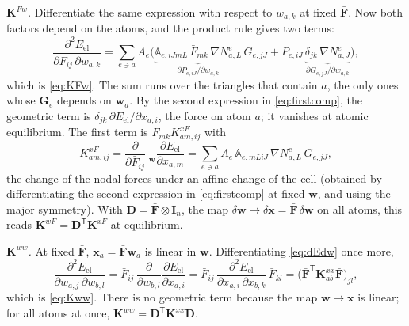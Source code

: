 \documentclass[11pt,a4paper]{article}
\newcommand{\Fb}{\bar{\mathbf F}}
\newcommand{\I}{\mathbf I}
\newcommand{\x}{\mathbf x}
\newcommand{\w}{\mathbf w}
\newcommand{\G}{\mathbf G}
\begin{document}
\emph{\(\mathbf K^{Fw}\).} Differentiate the same expression with respect to \(w_{a,k}\) at fixed
\(\Fb\). Now both factors depend on the atoms, and the product rule gives two terms:
\[
  \frac{\partial^2E_{\mathrm{el}}}{\partial\bar F_{ij}\,\partial w_{a,k}}
  =\sum_{e\ni a}A_e\Big(\underbrace{\mathbb A_{e,iJmL}\,\bar F_{mk}\,\nabla N^e_{a,L}}_{\partial P_{e,iJ}/\partial w_{a,k}}\,G_{e,jJ}
   +P_{e,iJ}\,\underbrace{\delta_{jk}\,\nabla N^e_{a,J}}_{\partial G_{e,jJ}/\partial w_{a,k}}\Big),
\]
which is \eqref{eq:KFw}. The sum runs over the triangles that contain \(a\), the only ones whose
\(\G_e\) depends on \(\w_a\). By the second expression in \eqref{eq:firstcomp}, the geometric term is
\(\delta_{jk}\,\partial E_{\mathrm{el}}/\partial x_{a,i}\), the force on atom \(a\); it vanishes at atomic
equilibrium. The first term is \(\bar F_{mk}K^{xF}_{am,ij}\) with
\begin{equation}
  K^{xF}_{am,ij}=\frac{\partial}{\partial\bar F_{ij}}\Big|_{\w}\frac{\partial E_{\mathrm{el}}}{\partial x_{a,m}}
  =\sum_{e\ni a}A_e\,\mathbb A_{e,mLiJ}\,\nabla N^e_{a,L}\,G_{e,jJ},
  \label{eq:KxF}
\end{equation}
the change of the nodal forces under an affine change of the cell (obtained by differentiating the
second expression in \eqref{eq:firstcomp} at fixed \(\w\), and using the major symmetry). With
\(\mathbf D=\Fb\otimes\I_n\), the map \(\delta\w\mapsto\delta\x=\Fb\,\delta\w\) on all atoms, this reads
\(\mathbf K^{wF}=\mathbf D^{\mathsf T}\mathbf K^{xF}\) at equilibrium.

\emph{\(\mathbf K^{ww}\).} At fixed \(\Fb\), \(\x_a=\Fb\w_a\) is linear in \(\w\). Differentiating
\eqref{eq:dEdw} once more,
\[
  \frac{\partial^2E_{\mathrm{el}}}{\partial w_{a,j}\,\partial w_{b,l}}
  =\bar F_{ij}\,\frac{\partial}{\partial w_{b,l}}\frac{\partial E_{\mathrm{el}}}{\partial x_{a,i}}
  =\bar F_{ij}\,\frac{\partial^2E_{\mathrm{el}}}{\partial x_{a,i}\,\partial x_{b,k}}\,\bar F_{kl}
  =\big(\Fb^{\mathsf T}\mathbf K^{xx}_{ab}\Fb\big)_{jl},
\]
which is \eqref{eq:Kww}. There is no geometric term because the map \(\w\mapsto\x\) is linear; for all
atoms at once, \(\mathbf K^{ww}=\mathbf D^{\mathsf T}\mathbf K^{xx}\mathbf D\).
\end{document}
